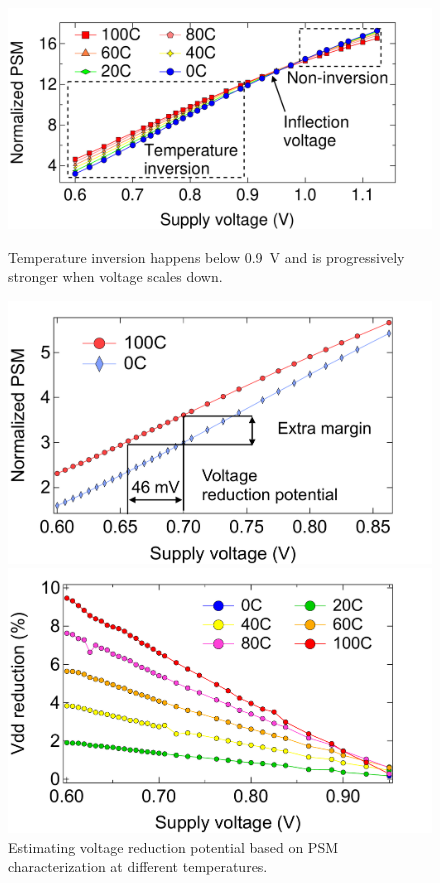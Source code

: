 \begin{figure}[t!]
  \centering
  \begin{minipage}{0.32\linewidth}
    \centering
      \includegraphics[trim=0 0 50 20,clip,width=.95\linewidth]{graphs/temperature/idle-psm-volt-temp.pdf}
      \caption{Temperature inversion happens below 0.9~V and is progressively stronger when voltage scales down.}
      \label{fig:psm-wide-range}
    \end{minipage}
\hfill
  \begin{minipage}{0.32\linewidth}
    \centering
         \includegraphics[trim=0 0 50 20,clip,width=.95\linewidth]{graphs/temperature/idle-psm-volt-nt.pdf}
       \caption{Estimating voltage reduction potential based on PSM characterization at different temperatures.}
       \label{fig:psm-nt}  
    \end{minipage}
\hfill
  \begin{minipage}{0.32\linewidth}
    \centering
      \includegraphics[trim=0 0 50 20,clip,width=.95\linewidth]{graphs/temperature/extrapolate-uv-potential.pdf}

\end{minipage}
\end{figure}
